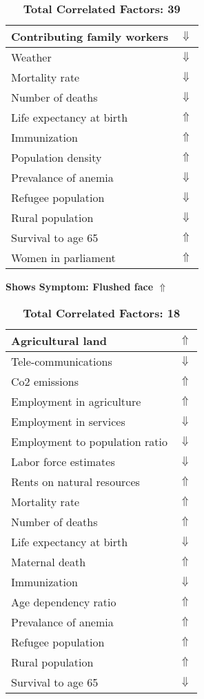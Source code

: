\documentclass[12pt,notitlepage,oneside]{report}
\begin{document}
\begin{table}[!htb]
\begin{tabular}{|l|l|}
Contributing family workers & $\Downarrow$\\ \hline
Weather & $\Downarrow$\\ \hline
Mortality rate & $\Downarrow$\\ \hline
Number of deaths & $\Downarrow$\\ \hline
Life expectancy at birth & $\Uparrow$\\ \hline
Immunization & $\Uparrow$\\ \hline
Population density & $\Uparrow$\\ \hline
Prevalance of anemia & $\Downarrow$\\ \hline
Refugee population & $\Downarrow$\\ \hline
Rural population & $\Downarrow$\\ \hline
Survival to age 65 & $\Uparrow$\\ \hline
Women in parliament & $\Uparrow$\\ \hline
\end{tabular}
\caption*{\textbf{Total Correlated Factors: 39}}
\end{table}
\clearpage
\begin{table}[!htb]
\caption{\textbf{Shows Symptom: Flushed face $\Uparrow$}}
\centering
\label{Correlated Socio-economic Factors0}
\begin{tabular}{|l|l|}
\hline
Agricultural land & $\Uparrow$\\ \hline
Tele-communications & $\Downarrow$\\ \hline
Co2 emissions & $\Uparrow$\\ \hline
Employment in agriculture & $\Uparrow$\\ \hline
Employment in services & $\Downarrow$\\ \hline
Employment to population ratio & $\Downarrow$\\ \hline
Labor force estimates & $\Downarrow$\\ \hline
Rents on natural resources & $\Uparrow$\\ \hline
Mortality rate & $\Uparrow$\\ \hline
Number of deaths & $\Uparrow$\\ \hline
Life expectancy at birth & $\Downarrow$\\ \hline
Maternal death & $\Uparrow$\\ \hline
Immunization & $\Downarrow$\\ \hline
Age dependency ratio & $\Uparrow$\\ \hline
Prevalance of anemia & $\Uparrow$\\ \hline
Refugee population & $\Uparrow$\\ \hline
Rural population & $\Uparrow$\\ \hline
Survival to age 65 & $\Downarrow$\\ \hline
\end{tabular}
\caption*{\textbf{Total Correlated Factors: 18}}
\end{table}
\end{document}
